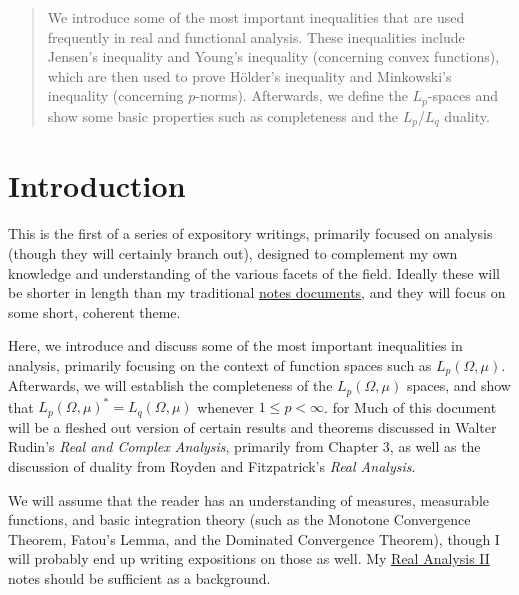 \documentclass[10pt]{mypackage}
\begin{document}
\RaggedRight
\begin{abstract}
  \noindent We introduce some of the most important inequalities that are used frequently in real and functional analysis. These inequalities include Jensen's inequality and Young's inequality (concerning convex functions), which are then used to prove Hölder's inequality and Minkowski's inequality (concerning $p$-norms). Afterwards, we define the $L_p$-spaces and show some basic properties such as completeness and the $L_p$/$L_q$ duality.
\end{abstract}
\tableofcontents
\section{Introduction}%
This is the first of a series of expository writings, primarily focused on analysis (though they will certainly branch out), designed to complement my own knowledge and understanding of the various facets of the field. Ideally these will be shorter in length than my traditional \href{https://ai.avinash-iyer.com/classnotes.html}{notes documents}, and they will focus on some short, coherent theme.\newline

Here, we introduce and discuss some of the most important inequalities in analysis, primarily focusing on the context of function spaces such as $L_p\left( \Omega,\mu \right)$. Afterwards, we will establish the completeness of the $L_p\left( \Omega,\mu \right)$ spaces, and show that $L_p\left( \Omega,\mu \right)^{\ast} = L_q\left( \Omega,\mu \right)$ whenever $1 \leq p < \infty$. for Much of this document will be a fleshed out version of certain results and theorems discussed in Walter Rudin's \textit{Real and Complex Analysis}, primarily from Chapter 3, as well as the discussion of duality from Royden and Fitzpatrick's \textit{Real Analysis}.\newline

We will assume that the reader has an understanding of measures, measurable functions, and basic integration theory (such as the Monotone Convergence Theorem, Fatou's Lemma, and the Dominated Convergence Theorem), though I will probably end up writing expositions on those as well. My \href{https://ai.avinash-iyer.com/Classes_and_Homework/College/Y3/Y3S2,\%20Real\%20II/real_2_notes.pdf}{Real Analysis II} notes should be sufficient as a background.
\end{document}
